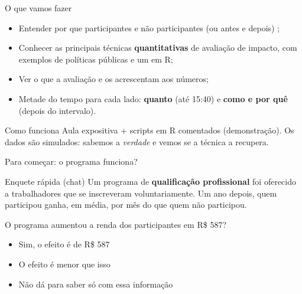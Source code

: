 \begin{frame}{O que vamos fazer}
  \begin{itemize}
    \item Entender por que  participantes e não participantes (ou antes e depois) ;
    \item Conhecer as principais técnicas \textbf{quantitativas} de avaliação de impacto, com exemplos de políticas públicas e um  em R;
    \item Ver o que a avaliação  e os  acrescentam aos números;
    \item Metade do tempo para cada lado: \textbf{quanto} (até 15:40) e \textbf{como e por quê} (depois do intervalo).
  \end{itemize}
  \vspace{0.2cm}
  \begin{block}{Como funciona}
    \small Aula expositiva + scripts em R comentados (demonstração). Os dados são simulados: sabemos a \emph{verdade} e vemos se a técnica a recupera.
  \end{block}
\end{frame}

\begin{frame}{Para começar: o programa funciona?}
  \begin{exerciciobox}{Enquete rápida (chat)}
    \small
    Um programa de \textbf{qualificação profissional} foi oferecido a trabalhadores que se inscreveram voluntariamente. Um ano depois, quem participou ganha, em média,  por mês do que quem não participou.
  \end{exerciciobox}
  \vspace{0.2cm}
  O programa aumentou a renda dos participantes em R\$ 587?
  \begin{itemize}
    \item[(a)] Sim, o efeito é de R\$ 587
    \item[(b)] O efeito é menor que isso
    \item[(c)] Não dá para saber só com essa informação
  \end{itemize}
\end{frame}

